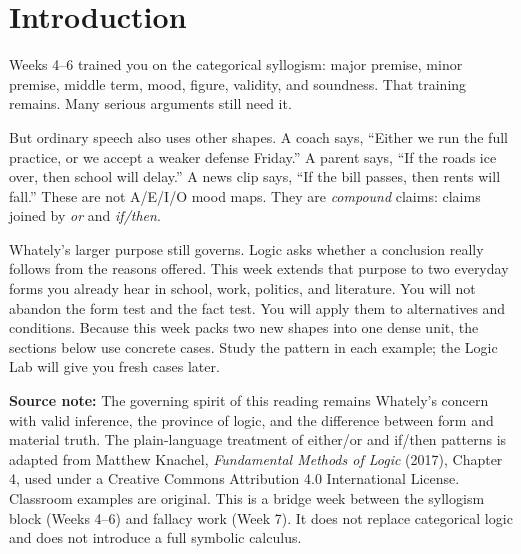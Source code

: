 \documentclass[12pt]{article}
\newcommand{\focusbox}[1]{\par\vspace{0.35em}\noindent\begingroup\setlength{\fboxsep}{5.5pt}\colorbox{gray!12}{\begin{minipage}{\dimexpr\linewidth-2\fboxsep\relax}#1\end{minipage}}\endgroup\par\vspace{0.4em}}
\begin{document}
\section*{Introduction}
Weeks 4--6 trained you on the categorical syllogism: major premise, minor premise, middle term, mood, figure, validity, and soundness. That training remains. Many serious arguments still need it.

But ordinary speech also uses other shapes. A coach says, ``Either we run the full practice, or we accept a weaker defense Friday.'' A parent says, ``If the roads ice over, then school will delay.'' A news clip says, ``If the bill passes, then rents will fall.'' These are not A/E/I/O mood maps. They are \textit{compound} claims: claims joined by \textit{or} and \textit{if/then}.

Whately's larger purpose still governs. Logic asks whether a conclusion really follows from the reasons offered. This week extends that purpose to two everyday forms you already hear in school, work, politics, and literature. You will not abandon the form test and the fact test. You will apply them to alternatives and conditions. Because this week packs two new shapes into one dense unit, the sections below use concrete cases. Study the pattern in each example; the Logic Lab will give you fresh cases later.

\focusbox{\textbf{Source note:} The governing spirit of this reading remains Whately's concern with valid inference, the province of logic, and the difference between form and material truth. The plain-language treatment of either/or and if/then patterns is adapted from Matthew Knachel, \textit{Fundamental Methods of Logic} (2017), Chapter 4, used under a Creative Commons Attribution 4.0 International License. Classroom examples are original. This is a bridge week between the syllogism block (Weeks 4--6) and fallacy work (Week 7). It does not replace categorical logic and does not introduce a full symbolic calculus.}
\end{document}

